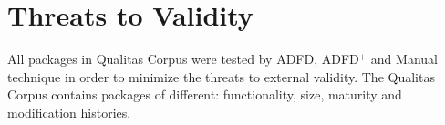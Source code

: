 



%		 





\section{Threats to Validity} \label{sec:threat}
All packages in Qualitas Corpus were tested by ADFD, ADFD$^+$ and Manual technique in order to minimize the threats to external validity. The Qualitas Corpus contains packages of different: functionality, size, maturity and modification histories.

